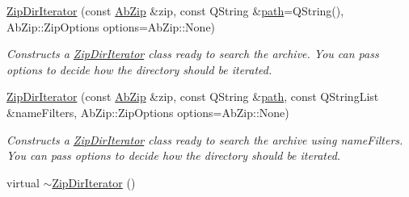 \begin{DoxyCompactItemize}
\item 
\hyperlink{class_zip_dir_iterator_a247697e7ae174a120a70ee1a2649c15e}{Zip\+Dir\+Iterator} (const \hyperlink{class_ab_zip}{Ab\+Zip} \&zip, const Q\+String \&\hyperlink{class_zip_dir_iterator_a696786be9be2b184e56fd78cf2688d4f}{path}=Q\+String(), Ab\+Zip\+::\+Zip\+Options options=Ab\+Zip\+::\+None)
\begin{DoxyCompactList}\small\item\em Constructs a \hyperlink{class_zip_dir_iterator}{Zip\+Dir\+Iterator} class ready to search the archive. You can pass options to decide how the directory should be iterated. \end{DoxyCompactList}\item 
\hyperlink{class_zip_dir_iterator_a8238d94253790ecf14c0144622c93411}{Zip\+Dir\+Iterator} (const \hyperlink{class_ab_zip}{Ab\+Zip} \&zip, const Q\+String \&\hyperlink{class_zip_dir_iterator_a696786be9be2b184e56fd78cf2688d4f}{path}, const Q\+String\+List \&name\+Filters, Ab\+Zip\+::\+Zip\+Options options=Ab\+Zip\+::\+None)
\begin{DoxyCompactList}\small\item\em Constructs a \hyperlink{class_zip_dir_iterator}{Zip\+Dir\+Iterator} class ready to search the archive using name\+Filters. You can pass options to decide how the directory should be iterated. \end{DoxyCompactList}\item 
virtual \hyperlink{class_zip_dir_iterator_af4fdbc99dc568df6f3c7851cfb4d3c02}{$\sim$\+Zip\+Dir\+Iterator} ()\hypertarget{class_zip_dir_iterator_af4fdbc99dc568df6f3c7851cfb4d3c02}{}\label{class_zip_dir_iterator_af4fdbc99dc568df6f3c7851cfb4d3c02}


\end{DoxyCompactItemize}
